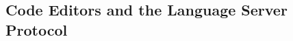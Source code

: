 \documentclass[sigplan,10pt,review,anonymous]{acmart}
\begin{document}

\subsection{Code Editors and the Language Server Protocol}
\label{sec:contextSourceCodeEditors}
\end{document}
